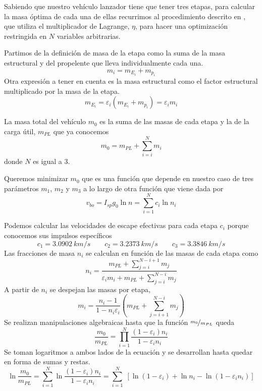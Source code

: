 \documentclass{article}
\begin{document}
Sabiendo que nuestro vehículo lanzador tiene que tener tres etapas, para calcular la masa óptima de cada una de ellas recurrimos al procedimiento descrito en \cite{curtis}, que utiliza el multiplicador de Lagrange, $\eta$, para hacer una optimización restringida en $N$ variables arbitrarias.

Partimos de la definición de masa de la etapa como la suma de la masa estructural y del propelente que lleva individualmente cada una.
\begin{equation} \label{eq:mi}
    m_i = m_{E_i} + m_{p_i}
\end{equation}
Otra expresión a tener en cuenta es la masa estructural como el factor estructural multiplicado por la masa de la etapa.
\begin{equation} \label{eq:mei}
    m_{E_i} = \varepsilon_i (m_{E_i} + m_{p_i}) = \varepsilon_i m_i
\end{equation}

La masa total del vehículo $m_0$ es la suma de las masas de cada etapa y la de la carga útil, $m_{PL}$ que ya conocemos
\begin{equation} \label{eq:m0}
    m_0 = m_{PL} +  \sum_{i=i}^N m_i
\end{equation}
donde $N$ es igual a 3.

Queremos minimizar $m_0$ que es una función que depende en nuestro caso de tres parámetros $m_1$, $m_2$ y $m_3$ a lo largo de otra función que viene dada por
\begin{equation} \label{eq:vbo}
    v_{bo} = I_{sp}g_0 \ln n = \sum_{i=1}^N c_i \ln n_i
\end{equation}

Podemos calcular las velocidades de escape efectivas para cada etapa $c_i$ porque conocemos sus impulsos específicos
\[ c_1 = \qty{3.0902}{km/s} \qquad c_2 = \qty{3,2373}{km/s} \qquad c_3 = \qty{3.3846}{km/s} \]
Las fracciones de masa $n_i$ se calculan en función de las masas de cada etapa como
\begin{equation}
    n_i = \frac{m_{PL} + \sum_{j=i}^{N-i+1} m_j}{\varepsilon_i m_i + m_{PL} + \sum_{j=i}^{N-i} m_j}
\end{equation}
A partir de $n_i$ se despejan las masas por etapa,
\begin{equation} \label{eq:m}
    m_i = \frac{n_i - 1}{1 - n_i\varepsilon_i} \left(m_{PL} + \sum^{N-i}_{j=i+1} m_j \right)
\end{equation}
Se realizan manipulaciones algebraicas hasta que la función $\nicefrac{m_0}{m_{PL}}$ queda
\begin{equation}
    \frac{m_0}{m_{PL}} = \prod_{i=1}^N \frac{(1-\varepsilon_i)n_i}{1-\varepsilon_i n_i}
\end{equation}
Se toman logaritmos a ambos lados de la ecuación y se desarrollan hasta quedar en forma de sumas y restas.
\begin{equation}
    \ln\frac{m_0}{m_{PL}} = \sum_{i=1}^N \ln \frac{(1-\varepsilon_i) n_i}{1 - \varepsilon_i n_i} = \sum_{i=1}^N \;[\ln(1-\varepsilon_i) + \ln n_i - \ln(1 - \varepsilon_i n_i)]
\end{equation}
\end{document}
